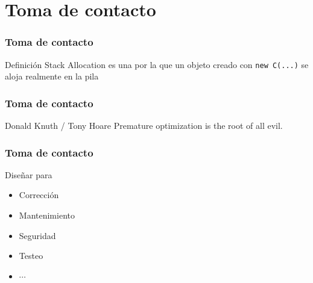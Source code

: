 
\section{Toma de contacto}
\def\ft{Toma de contacto}




\begin{frame}[fragile]
  \frametitle{\ft}
  \begin{block}{Definición}
    Stack Allocation es una
    por la que un objeto creado con {\tt new~C(...)}
    se aloja realmente en la pila
  \end{block}
\end{frame}

\begin{frame}[fragile]
  \frametitle{\ft}
  \begin{block}{Donald Knuth / Tony Hoare}
    {Premature optimization is the root of all evil.}
  \end{block}
\end{frame}

\begin{frame}[fragile]
  \frametitle{\ft}
  \begin{block}{Diseñar para}
    \begin{itemize}
    \item Corrección
    \item Mantenimiento
    \item Seguridad
    \item Testeo
    \item $\cdots$
    \end{itemize}
  \end{block}
\end{frame}
